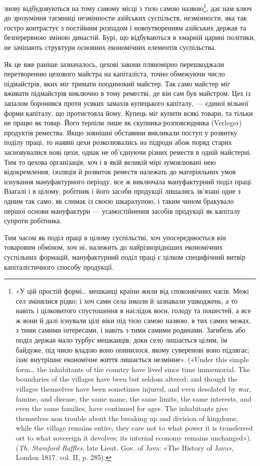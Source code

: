 \parcont{}  %
знову відбудовуються на тому самому місці з тією самою назвою\footnote{
«У цій простій формі\dots{} мешканці країни жили від споконвічних
часів. Межі сел змінялися рідко; і хоч сами села інколи й зазнавали
ушкоджень, а то навіть і цілковитого спустошення в наслідок воєн,
голоду та пошестей, а все ж вони й далі існували цілі віки під тією самою
назвою, в тих самих межах, з тими самими інтересами, і навіть з тими
самими родинами. Загибель або поділ держав мало турбує мешканців;
доки село лишається цілим, їм байдуже, під чиєю владою воно опинилося,
якому суверенові воно підлягає; їхнє внутрішнє економічне життя
лишається незмінне». («Under this simple form\dots{} the inhabitants of the
country have lived since time immemorial. The boundaries of the villages
have been but seldom altered; and though the villages themselves have
been sometimes injured, and even desolated by war, famine, and disease,
the same name, the same limits, the same interests, and even the same
families, have continued for ages. The inhabitants give themselves non
trouble about the breaking up and division of kingdoms; while the village
remains entire, they care not to what power it is transferred ort to what
sovereign it devolves; its internal economy remains unchanged»). (\emph{Th. Stamford
Raffles}, late Lieut. Gov. of Java: «The History of Java», London 1817.
vol. II, p. 285).
}, дає нам ключ до зрозуміння таємниці незмінности азійських
суспільств, незмінности, яка так гостро контрастує з постійним
розпадом і новоутворенням азійських держав та безперервною
зміною династій. Бурі, що відбуваються в хмарній царині політики,
не зачіпають структури основних економічних елементів
суспільства.

Як це вже раніше зазначалось, цехові закони пляномірно
перешкоджали перетворенню цехового майстра на капіталіста,
точно обмежуючи число підмайстрів, яких міг тримати поодинокий
майстер. Так само майстер міг вживати підмайстрів виключно
в тому реместві, де він сам був майстром. Цех із запалом
боронився проти усяких замахів купецького капіталу, —
єдиної вільної форми капіталу, що протистояла йому. Купець
міг купити всякі товари, та тільки не працю як товар. Його терпіли
лише як скупника-розповсюдника (Verleger) продуктів
ремества. Якщо зовнішні обставини викликали поступ у розвитку
поділу праці, то наявні цехи розколювались на підроди абож
поряд старих засновувалися нові цехи, однак не об’єднуючи різних
реместв в одній майстерні. Тим то цехова організація, хоч і в
якій великій мірі зумовлювані нею відокремлення, ізоляція й
розвиток реместв належать до матеріяльних умов існування
мануфактурного періоду, все ж виключала мануфактурний поділ
праці. Взагалі і в цілому, робітник і його засоби продукції
лишались зв’язані одне з одним так само, як слимак із своєю
шкаралупою, і таким чином бракувало першої основи мануфактури
— усамостійнення засобів продукції як капіталу супроти
робітника.

Тим часом як поділ праці в цілому суспільстві, хоч упосереднюється
він товаровим обміном, хоч ні, належить до найрізнорідніших
економічних суспільних формацій, мануфактурний
поділ праці є цілком специфічний витвір капіталістичного способу
продукції.
